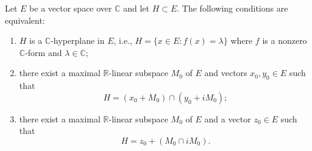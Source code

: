 Let $E$ be a vector space over $\mathbb{C}$ and let $H \subset E$. The following conditions are equivalent:
\begin{enumerate}
\item[(a)] $H$ is a $\mathbb{C}$-hyperplane in $E$, i.e., $H = \{x \in E : f(x) = \lambda\}$ where $f$ is a nonzero $\mathbb{C}$-form and $\lambda \in \mathbb{C}$;
\item[(b)] there exist a maximal $\mathbb{R}$-linear subspace $M_0$ of $E$ and vectors $x_0, y_0 \in E$ such that
$$H = (x_0 + M_0) \cap (y_0 + iM_0);$$
\item[(c)] there exist a maximal $\mathbb{R}$-linear subspace $M_0$ of $E$ and a vector $z_0 \in E$ such that
$$H = z_0 + (M_0 \cap iM_0).$$
\end{enumerate}
